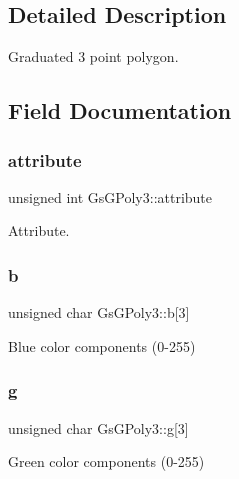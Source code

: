 \subsection{Detailed Description}
Graduated 3 point polygon. 

\subsection{Field Documentation}
\mbox{\label{structGsGPoly3_a3c8f401c79e4238327f6068479de9c48}} 
\subsubsection{\texorpdfstring{attribute}{attribute}}
{\footnotesize\ttfamily unsigned int Gs\+G\+Poly3\+::attribute}



Attribute. 

\mbox{\label{structGsGPoly3_ab14e694e5e825fc17a3bdec4e54dae59}} 
\subsubsection{\texorpdfstring{b}{b}}
{\footnotesize\ttfamily unsigned char Gs\+G\+Poly3\+::b\mbox{[}3\mbox{]}}



Blue color components (0-\/255) 

\mbox{\label{structGsGPoly3_ac2480a7e16ac62b8560faa7b5c8fc69b}} 
\subsubsection{\texorpdfstring{g}{g}}
{\footnotesize\ttfamily unsigned char Gs\+G\+Poly3\+::g\mbox{[}3\mbox{]}}



Green color components (0-\/255) 

\mbox{\label{structGsGPoly3_a9d8181d4a7c066a57d9f38a76f04284b}} 
